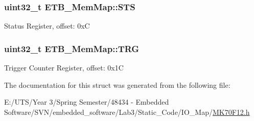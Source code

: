 \subsubsection[{S\+T\+S}]{\setlength{\rightskip}{0pt plus 5cm}uint32\+\_\+t E\+T\+B\+\_\+\+Mem\+Map\+::\+S\+T\+S}\label{struct_e_t_b___mem_map_a5a471e968aca953fb748c16b10d56939}
Status Register, offset\+: 0x\+C \hypertarget{struct_e_t_b___mem_map_a96dc184cb9f6ea6ba7b299b05c58d4ed}{}
\subsubsection[{T\+R\+G}]{\setlength{\rightskip}{0pt plus 5cm}uint32\+\_\+t E\+T\+B\+\_\+\+Mem\+Map\+::\+T\+R\+G}\label{struct_e_t_b___mem_map_a96dc184cb9f6ea6ba7b299b05c58d4ed}
Trigger Counter Register, offset\+: 0x1\+C 

The documentation for this struct was generated from the following file\+:\begin{DoxyCompactItemize}
\item 
E\+:/\+U\+T\+S/\+Year 3/\+Spring Semester/48434 -\/ Embedded Software/\+S\+V\+N/embedded\+\_\+software/\+Lab3/\+Static\+\_\+\+Code/\+I\+O\+\_\+\+Map/\hyperlink{_m_k70_f12_8h}{M\+K70\+F12.\+h}\end{DoxyCompactItemize}
